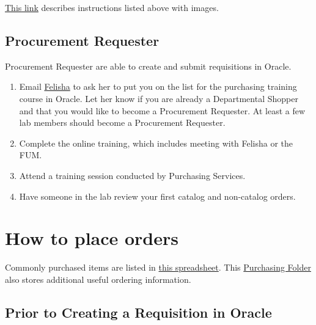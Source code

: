 \documentclass[
]{book}
\begin{document}
\href{https://guidedlearning.oracle.com/player/latest/api/scenario/export/+Rjdn_qARDujqKXlbZWDwA/4jxk6hii/?draft=true}{This link} describes instructions listed above with images.

\hypertarget{procurement-requester}{%
\subsection{Procurement Requester}\label{procurement-requester}}

Procurement Requester are able to create and submit requisitions in Oracle.

\begin{enumerate}
\def\labelenumi{\arabic{enumi}.}
\item
  Email \href{mailto:f.c.baquera@VANDERBILT.EDU}{Felisha} to ask her to put you on the list for the purchasing training course in Oracle. Let her know if you are already a Departmental Shopper and that you would like to become a Procurement Requester. At least a few lab members should become a Procurement Requester.
\item
  Complete the online training, which includes meeting with Felisha or the FUM.
\item
  Attend a training session conducted by Purchasing Services.
\item
  Have someone in the lab review your first catalog and non-catalog orders.
\end{enumerate}

\hypertarget{how-to-place-orders}{%
\section{How to place orders}\label{how-to-place-orders}}

Commonly purchased items are listed in \href{https://docs.google.com/spreadsheets/d/13m76wa6D7RpNgtVolgLW7oUlB0JmVAlQNCRtXGdosbc/edit?usp=sharing}{this spreadsheet}. This \href{https://drive.google.com/file/d/1MHIqY_gJsaVwZvy92M90tAaFEfcg_pQw/view?usp=sharing}{Purchasing Folder} also stores additional useful ordering information.

\hypertarget{prior-to-creating-a-requisition-in-oracle}{%
\subsection{Prior to Creating a Requisition in Oracle}\label{prior-to-creating-a-requisition-in-oracle}}
\end{document}
